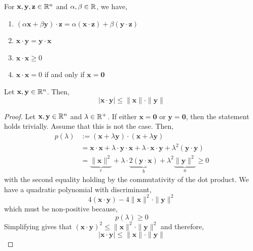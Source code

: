 \begin{rmk}
    For $\mathbf{x}, \mathbf{y}, \mathbf{z} \in \mathbb{R}^n$ and $\alpha, \beta \in \mathbb{R}$, we have,
    \begin{enumerate}
        \item $(\alpha \mathbf{x}+\beta \mathbf{y}) \cdot \mathbf{z}=\alpha(\mathbf{x} \cdot \mathbf{z})+\beta(\mathbf{y} \cdot \mathbf{z})$
        \item $\mathbf{x} \cdot \mathbf{y}=\mathbf{y} \cdot \mathbf{x}$
        \item $\mathbf{x} \cdot \mathbf{x} \geq 0$
        \item $\mathbf{x} \cdot \mathbf{x}=0$ if and only if $\mathbf{x}=\mathbf{0}$
    \end{enumerate}
\end{rmk}

\begin{thm}
     Let $\mathbf{x}, \mathbf{y} \in \mathbb{R}^n$. Then,
     \[|\mathbf{x} \cdot \mathbf{y}|  \leq\|\mathbf{x}\| \cdot \|\mathbf{y}\|\]
\end{thm}

\begin{proof}
     Let $\mathbf{x}, \mathbf{y} \in \mathbb{R}^n$ and $\lambda \in \mathbb{R}^+$. If either $\mathbf{x} = \mathbf{0}$ or $\mathbf{y} = \mathbf{0}$, then the statement holds trivially. Assume that this is not the case. Then,
     \begin{align*}
        p(\lambda) &:= (\mathbf{x}+\lambda \mathbf{y}) \cdot(\mathbf{x}+\lambda \mathbf{y}) \\
        &= \mathbf{x} \cdot \mathbf{x}+ \lambda \cdot \mathbf{y} \cdot \mathbf{x} + \lambda \cdot \mathbf{x} \cdot \mathbf{y} +\lambda^2 (\mathbf{y} \cdot \mathbf{y}) \\
        &= \underbrace{\|\mathbf{x}\|^2}_{c}+ \lambda \cdot \underbrace{2(\mathbf{y} \cdot \mathbf{x})}_{b} +\lambda^2\underbrace{\|\mathbf{y}\|^2}_{a} \geq 0
        \end{align*}
    \sloppy with the second equality holding by the commutativity of the dot product. We have a quadratic polynomial with discriminant,
    \[4(\mathbf{x} \cdot \mathbf{y})-4\|\mathbf{x}\|^2 \cdot\|\mathbf{y}\|^2\]
    which must be non-positive because,
    \[p(\lambda) \geq 0\]
    Simplifying gives that $(\mathbf{x} \cdot \mathbf{y})^2 \leq \|\mathbf{x}\|^2 \cdot\|\mathbf{y}\|^2$ and therefore,
    \[|\mathbf{x} \cdot \mathbf{y}| \leq\|\mathbf{x}\| \cdot \|\mathbf{y}\|\]
\end{proof}

